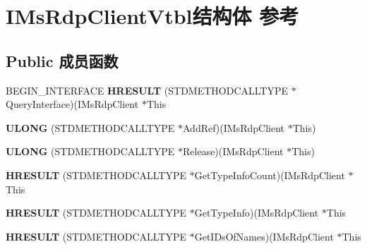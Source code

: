 \hypertarget{struct_i_ms_rdp_client_vtbl}{}\section{I\+Ms\+Rdp\+Client\+Vtbl结构体 参考}
\label{struct_i_ms_rdp_client_vtbl}
\subsection*{Public 成员函数}
\begin{DoxyCompactItemize}
\item 
\mbox{\label{struct_i_ms_rdp_client_vtbl_a40051a35442e49c890c9f26c8c7439e8}} 
B\+E\+G\+I\+N\+\_\+\+I\+N\+T\+E\+R\+F\+A\+CE {\bfseries H\+R\+E\+S\+U\+LT} (S\+T\+D\+M\+E\+T\+H\+O\+D\+C\+A\+L\+L\+T\+Y\+PE $\ast$Query\+Interface)(I\+Ms\+Rdp\+Client $\ast$This
\item 
\mbox{\label{struct_i_ms_rdp_client_vtbl_aaccd9a48dcce9b960dd833a2dcf9b847}} 
{\bfseries U\+L\+O\+NG} (S\+T\+D\+M\+E\+T\+H\+O\+D\+C\+A\+L\+L\+T\+Y\+PE $\ast$Add\+Ref)(I\+Ms\+Rdp\+Client $\ast$This)
\item 
\mbox{\label{struct_i_ms_rdp_client_vtbl_a1dc054f74ee834a8cb1c32597dc845a3}} 
{\bfseries U\+L\+O\+NG} (S\+T\+D\+M\+E\+T\+H\+O\+D\+C\+A\+L\+L\+T\+Y\+PE $\ast$Release)(I\+Ms\+Rdp\+Client $\ast$This)
\item 
\mbox{\label{struct_i_ms_rdp_client_vtbl_a41ec3c982552209948c9a595a58466f7}} 
{\bfseries H\+R\+E\+S\+U\+LT} (S\+T\+D\+M\+E\+T\+H\+O\+D\+C\+A\+L\+L\+T\+Y\+PE $\ast$Get\+Type\+Info\+Count)(I\+Ms\+Rdp\+Client $\ast$This
\item 
\mbox{\label{struct_i_ms_rdp_client_vtbl_a52dd99069fb9a18e23ace8d6f7b84234}} 
{\bfseries H\+R\+E\+S\+U\+LT} (S\+T\+D\+M\+E\+T\+H\+O\+D\+C\+A\+L\+L\+T\+Y\+PE $\ast$Get\+Type\+Info)(I\+Ms\+Rdp\+Client $\ast$This
\item 
\mbox{\label{struct_i_ms_rdp_client_vtbl_a23a1af0db36d5d62d61b91f4f5f02d74}} 
{\bfseries H\+R\+E\+S\+U\+LT} (S\+T\+D\+M\+E\+T\+H\+O\+D\+C\+A\+L\+L\+T\+Y\+PE $\ast$Get\+I\+Ds\+Of\+Names)(I\+Ms\+Rdp\+Client $\ast$This

\end{DoxyCompactItemize}
